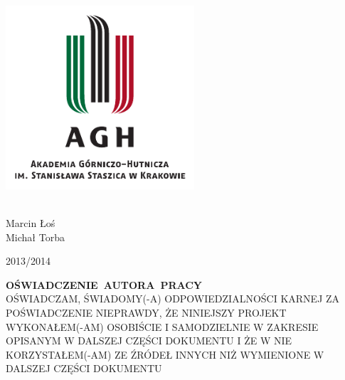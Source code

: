 
\begin{titlepage}
  \begin{center} 

    \includegraphics[width=7cm]{images/agh_logo}
    \vspace{0.5cm}

    {\Huge \textbf{\Title}}
    \\
    \vspace{1cm}
    Marcin Łoś \\
    Michał Torba

    \vfill
    2013\slash 2014

  \end{center}
	\newpage
	\thispagestyle{empty}

	\mbox{}
	\vfill

	\begin{flushright}
	\begin{minipage}[!h]{13cm}
	\mbox{\large{\scshape \textbf{OŚWIADCZENIE AUTORA PRACY}}}\\[3mm] 
	{\scshape OŚWIADCZAM, ŚWIADOMY(-A) ODPOWIEDZIALNOŚCI KARNEJ ZA POŚWIADCZENIE NIEPRAWDY, ŻE NINIEJSZY PROJEKT WYKONAŁEM(-AM) OSOBIŚCIE I SAMODZIELNIE W ZAKRESIE OPISANYM W DALSZEJ CZĘŚCI DOKUMENTU I ŻE W NIE KORZYSTAŁEM(-AM) ZE ŹRÓDEŁ INNYCH NIŻ WYMIENIONE W DALSZEJ CZĘŚCI DOKUMENTU}\\
	\end{minipage}

	\vspace{2cm}

	\makebox[6cm][s]{\dotfill}\par

	\end{flushright}
\end{titlepage}
